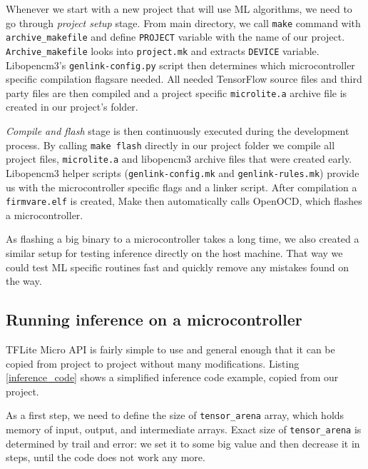 Whenever we start with a new project that will use ML algorithms, we need to go through \textit{project setup} stage.
From main directory, we call \verb|make| command with \verb|archive_makefile| and define \verb|PROJECT| variable with the name of our project.
\verb|Archive_makefile| looks into \verb|project.mk| and extracts \verb|DEVICE| variable.
Libopencm3's \verb|genlink-config.py| script then determines which microcontroller specific compilation flags\footnotemark are needed. 
All needed TensorFlow source files and third party files are then compiled and a project specific \verb|microlite.a| archive file is created in our project's folder.

\textit{Compile and flash} stage is then continuously executed during the development process.
By calling \verb|make flash| directly in our project folder we compile all project files, \verb|microlite.a| and libopencm3 archive files that were created early.
Libopencm3 helper scripts (\verb|genlink-config.mk| and \verb|genlink-rules.mk|) provide us with the microcontroller specific flags and a linker script.
After compilation a \verb|firmvare.elf| is created, Make then automatically calls OpenOCD, which flashes a microcontroller.

As flashing a big binary to a microcontroller takes a long time, we also created a similar setup for testing inference directly on the host machine.
That way we could test ML specific routines fast and quickly remove any mistakes found on the way.


\subsection{ Running inference on a microcontroller}

TFLite Micro API is fairly simple to use and general enough that it can be copied from project to project without many modifications.
Listing \ref{inference_code} shows a simplified inference code example, copied from our project.

As a first step, we need to define the size of \verb|tensor_arena| array, which holds memory of input, output, and intermediate arrays.
Exact size of \verb|tensor_arena| is determined by trail and error: we set it to some big value and then decrease it in steps, until the code does not work any more.

